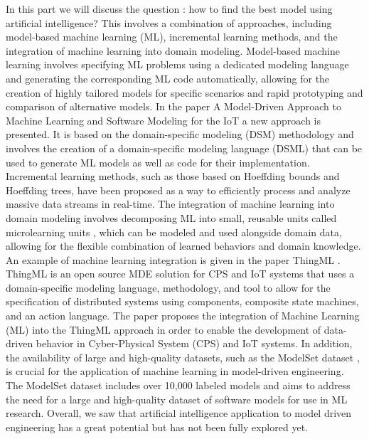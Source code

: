 In this part we will discuss the question : how to find the best model using artificial intelligence? This involves a combination of approaches, including model-based machine learning (ML), incremental learning methods, and the integration of machine learning into domain modeling. 
Model-based machine learning involves specifying ML problems using a dedicated modeling language and generating the corresponding ML code automatically, allowing for the creation of highly tailored models for specific scenarios and rapid prototyping and comparison of alternative models\cite{evolutionMDE}. In the paper A Model-Driven Approach to Machine Learning and Software Modeling for the IoT \cite{mdApproach} a new approach is presented. It is based on the domain-specific modeling (DSM) methodology and involves the creation of a domain-specific modeling language (DSML) that can be used to generate ML models as well as code for their implementation.
Incremental learning methods, such as those based on Hoeffding bounds and Hoeffding trees, have been proposed as a way to efficiently process and analyze massive data streams in real-time\cite{evolutionMDE}. 
The integration of machine learning into domain modeling involves decomposing ML into small, reusable units called microlearning units \cite{evolutionMDE}, which can be modeled and used alongside domain data, allowing for the flexible combination of learned behaviors and domain knowledge. An example of machine learning integration is given in the paper ThingML \cite{ThingML}.  ThingML is an open source MDE solution for CPS and IoT systems that uses a domain-specific modeling language, methodology, and tool to allow for the specification of distributed systems using components, composite state machines, and an action language. The paper proposes the integration of Machine Learning (ML) into the ThingML approach in order to enable the development of data-driven behavior in Cyber-Physical System (CPS) and IoT systems.
In addition, the availability of large and high-quality datasets, such as the ModelSet dataset \cite{modelset}, is crucial for the application of machine learning in model-driven engineering. The ModelSet dataset includes over 10,000 labeled models and aims to address the need for a large and high-quality dataset of software models for use in ML research.
Overall, we saw that artificial intelligence application to model driven engineering has a great potential but has not been fully explored yet. 

